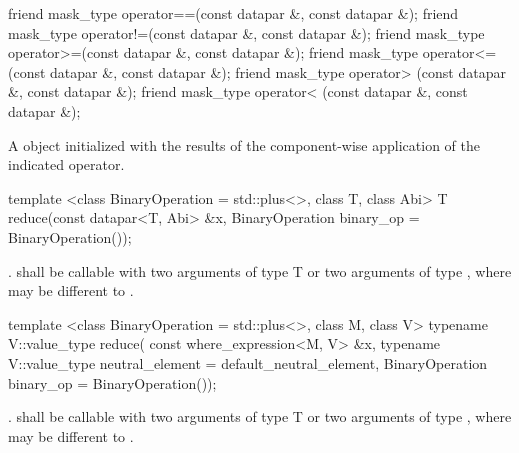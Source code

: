 \begin{itemdecl}
friend mask_type operator==(const datapar &, const datapar &);
friend mask_type operator!=(const datapar &, const datapar &);
friend mask_type operator>=(const datapar &, const datapar &);
friend mask_type operator<=(const datapar &, const datapar &);
friend mask_type operator> (const datapar &, const datapar &);
friend mask_type operator< (const datapar &, const datapar &);
\end{itemdecl}
\begin{itemdescr}
  \pnum\returns A \mask object initialized with the results of the component-wise application of the indicated operator.
\end{itemdescr}

\begin{itemdecl}
template <class BinaryOperation = std::plus<>, class T, class Abi>
T reduce(const datapar<T, Abi> &x, BinaryOperation binary_op = BinaryOperation());
\end{itemdecl}
\begin{itemdescr}
  \pnum\returns {} \foralli.
  \pnum\requires {} shall be callable with two arguments of type \type T or two arguments of type \datapar[<T, A1>], where  may be different to .
  \pnum{}
\end{itemdescr}

\begin{itemdecl}
template <class BinaryOperation = std::plus<>, class M, class V>
typename V::value_type reduce(
    const where_expression<M, V> &x,
    typename V::value_type neutral_element = default_neutral_element,
    BinaryOperation binary_op = BinaryOperation());
\end{itemdecl}
\begin{itemdescr}
  \pnum\returns {} .
  \pnum\requires {} shall be callable with two arguments of type \type T or two arguments of type \datapar[<T, A1>], where  may be different to .
  \pnum{}
\end{itemdescr}


